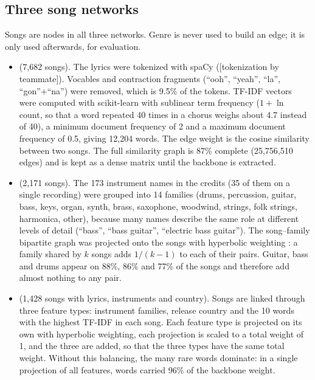 \subsection*{Three song networks}
Songs are nodes in all three networks. Genre is never used to build an edge; it is only used afterwards, for evaluation.
\begin{itemize}
  \item \textbf{\Glyr} (7,682 songs). The lyrics were tokenized with spaCy \cite{TODO_spacy} ([tokenization by teammate]). Vocables and contraction fragments (``ooh'', ``yeah'', ``la'', ``gon''+``na'') were removed, which is 9.5\% of the tokens. TF-IDF vectors \cite{TODO_jurafsky_slp3} were computed with scikit-learn \cite{TODO_sklearn} with sublinear term frequency ($1+\ln$ count, so that a word repeated 40 times in a chorus weighs about 4.7 instead of 40), a minimum document frequency of 2 and a maximum document frequency of 0.5, giving 12,204 words. The edge weight is the cosine similarity between two songs. The full similarity graph is 87\% complete (25,756,510 edges) and is kept as a dense matrix until the backbone is extracted.
  \item \textbf{\Ginst} (2,171 songs). The 173 instrument names in the credits (35 of them on a single recording) were grouped into 14 families (drums, percussion, guitar, bass, keys, organ, synth, brass, saxophone, woodwind, strings, folk strings, harmonica, other), because many names describe the same role at different levels of detail (``bass'', ``bass guitar'', ``electric bass guitar''). The song--family bipartite graph was projected onto the songs with hyperbolic weighting \cite{TODO_newman2001hyperbolic}: a family shared by $k$ songs adds $1/(k-1)$ to each of their pairs. Guitar, bass and drums appear on 88\%, 86\% and 77\% of the songs and therefore add almost nothing to any pair.
  \item \textbf{\Gcomb} (1,428 songs with lyrics, instruments and country). Songs are linked through three feature types: instrument families, release country and the 10 words with the highest TF-IDF in each song. Each feature type is projected on its own with hyperbolic weighting, each projection is scaled to a total weight of 1, and the three are added, so that the three types have the same total weight. Without this balancing, the many rare words dominate: in a single projection of all features, words carried 96\% of the backbone weight.
\end{itemize}

